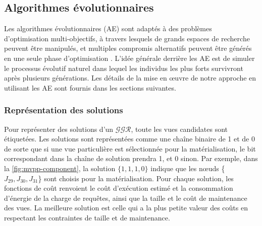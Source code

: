 \subsection{Algorithmes évolutionnaires}\label{subsec:EvolutionaryAlgorithms}
Les algorithmes évolutionnaires (AE) sont adaptés à des problèmes d'optimisation multi-objectifs, à travers lesquels de grands espaces de recherche peuvent être manipulés, et multiples compromis alternatifs peuvent être générés en une seule phase d'optimisation \cite{Zhou2011}.
L'idée générale derrière les AE est de simuler le processus évolutif naturel dans lequel les individus les plus forts survivront après plusieurs générations. Les détails de la mise en œuvre de notre approche en utilisant les AE sont fournis dans les sections suivantes.

\subsubsection{Représentation des solutions}\label{subsubsec:SolutionRepresentation}
Pour représenter des solutions d'un $\mathcal{GGR}$, toute les vues candidates sont étiquetées. Les solutions sont représentées comme une chaîne binaire de 1 et de 0 de sorte que si une vue particulière est sélectionnée pour la matérialisation, le bit correspondant dans la chaîne de solution prendra 1, et 0 sinon. Par exemple, dans la \ref{fig:mvpp-component}, la solution $\{1,1,1,0\}$ indique que les nœuds \{\texttt{$J_{29}, J_{30}, J_{31}$}\} sont choisis pour la matérialisation.
Pour chaque solution, les fonctions de coût renvoient le coût d'exécution estimé et la consommation d'énergie de la charge de requêtes, ainsi que la taille et le coût de maintenance des vues. La meilleure solution est celle qui a la plus petite valeur des coûts en respectant les contraintes de taille et de maintenance.

